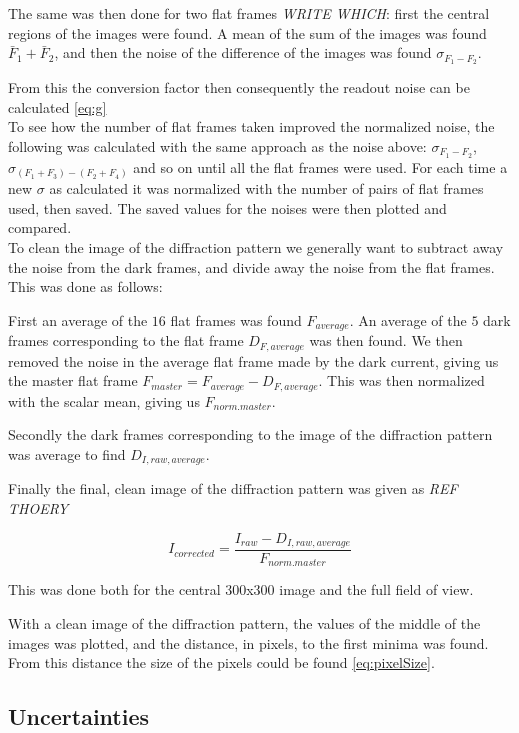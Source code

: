 \documentclass{emulateapj}
\begin{document}
The same was then done for two flat frames \emph{WRITE WHICH}: first the central regions of the images were found. A mean of the sum of the images was found $\bar{F}_1 + \bar{F}_2$, and then the noise of the difference of the images was found $\sigma_{F_1 - F_2}$.

From this the conversion factor then consequently the readout noise can be calculated \eqref{eq:g}\\

To see how the number of flat frames taken improved the normalized noise, the following was calculated with the same approach as the noise above:
$\sigma_{F_1-F_2}$, $\sigma_{(F_1 + F_3) - (F_2+F_4)}$ and so on until all the flat frames were used. For each time a new $\sigma$ as calculated it was normalized with the number of pairs of flat frames used, then saved. The saved values for the noises were then plotted and compared.\\

To clean the image of the diffraction pattern we generally want to subtract away the noise from the dark frames, and divide away the noise from the flat frames. This was done as follows:

First an average of the $16$ flat frames was found $F_{average}$. An average of the $5$ dark frames corresponding to the flat frame $D_{F,average}$ was then found. We then removed the noise in the average flat frame made by the dark current, giving us the master flat frame $F_{master} = F_{average}-D_{F,average}$. This was then normalized with the scalar mean, giving us $F_{norm. master}$.

Secondly the dark frames corresponding to the image of the diffraction pattern was average to find $D_{I,raw,average}$. 

Finally the final, clean image of the diffraction pattern was given as \emph{REF THOERY}

\begin{equation}
I_{corrected} = \frac{I_{raw} - D_{I,raw,average}}{F_{norm. master}}
\end{equation}

This was done both for the central 300x300 image and the full field of view.

With a clean image of the diffraction pattern, the values of the middle of the images was plotted, and the distance, in pixels, to the first minima was found. From this distance the size of the pixels could be found \eqref{eq:pixelSize}. 

\subsection{Uncertainties}
\end{document}
